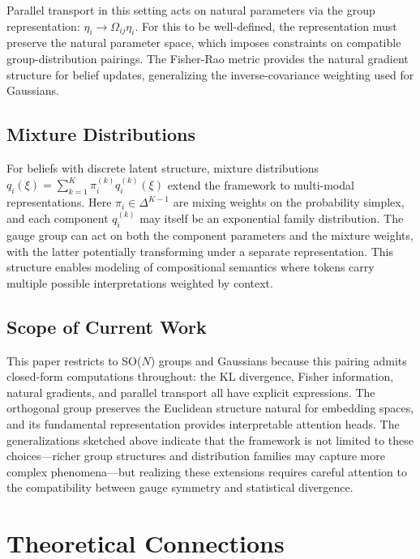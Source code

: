 \documentclass[twoside,11pt]{article}
\begin{document}
Parallel transport in this setting acts on natural parameters via the group representation: $\eta_i \to \Omega_{ij} \eta_i$. For this to be well-defined, the representation must preserve the natural parameter space, which imposes constraints on compatible group-distribution pairings. The Fisher-Rao metric provides the natural gradient structure for belief updates, generalizing the inverse-covariance weighting used for Gaussians.

\subsection{Mixture Distributions}

For beliefs with discrete latent structure, mixture distributions $q_i(\xi) = \sum_{k=1}^K \pi_i^{(k)} q_i^{(k)}(\xi)$ extend the framework to multi-modal representations. Here $\pi_i \in \Delta^{K-1}$ are mixing weights on the probability simplex, and each component $q_i^{(k)}$ may itself be an exponential family distribution. The gauge group can act on both the component parameters and the mixture weights, with the latter potentially transforming under a separate representation. This structure enables modeling of compositional semantics where tokens carry multiple possible interpretations weighted by context.

\subsection{Scope of Current Work}

This paper restricts to SO($N$) groups and Gaussians because this pairing admits closed-form computations throughout: the KL divergence, Fisher information, natural gradients, and parallel transport all have explicit expressions. The orthogonal group preserves the Euclidean structure natural for embedding spaces, and its fundamental representation provides interpretable attention heads. The generalizations sketched above indicate that the framework is not limited to these choices---richer group structures and distribution families may capture more complex phenomena---but realizing these extensions requires careful attention to the compatibility between gauge symmetry and statistical divergence.

\section{Theoretical Connections}
\label{app:theoretical_connections}
\end{document}
